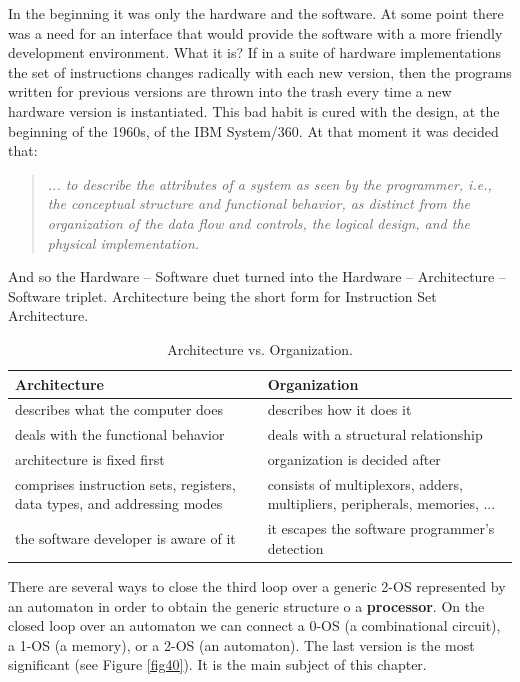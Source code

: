 \bigskip
In the beginning it was only the hardware and the software. At some point there was a need for an interface that would provide the software with a more friendly development environment. What it is? If in a suite of hardware implementations the set of instructions changes radically with each new version, then the programs written for previous versions are thrown into the trash every time a new hardware version is instantiated. This bad habit is cured with the design, at the beginning of the 1960s, of the IBM System/360. At that moment it was decided that:
\begin{quote}
{\em ... to describe the
attributes of a system as seen by the programmer, i.e., the conceptual structure
and functional behavior, as distinct from the organization of the data flow and
controls, the logical design, and the physical implementation.} \citep{Amdahl64}
\end{quote}
And so the Hardware -- Software duet turned into the Hardware -- Architecture -- Software triplet. Architecture being the short form for Instruction Set Architecture.
\begin{table}[H]
  \begin{center}
    \caption{Architecture vs. Organization.}
    \label{avso}
    {\small
    \begin{tabular}{|p{6cm}|p{6cm}|}
      \hline
     {\bf Architecture}                 & {\bf Organization}                                \\ \hline \hline
     describes what the computer does   & describes how it does it                          \\ \hline
     deals with the functional behavior & deals with a structural relationship              \\ \hline
     architecture is fixed first        & organization is decided after     \\ \hline
     comprises instruction sets, registers, data types, and addressing modes & consists of  multiplexors, adders, multipliers, peripherals, memories, ...\\ \hline
     the software developer is aware of it & it escapes the software programmer’s detection\\ \hline
    \end{tabular}
    }
  \end{center}
\end{table}


There are several ways to close the third loop over a generic 2-OS represented by an automaton in order to obtain the generic structure o a {\bf processor}. On the closed loop over an automaton we can connect a 0-OS (a combinational circuit), a 1-OS (a memory), or a 2-OS (an automaton). The last version is the most significant (see Figure \ref{fig40}). It is the main subject of this chapter.


